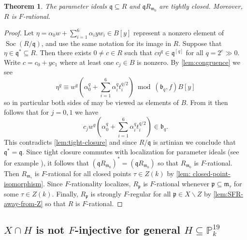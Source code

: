 \documentclass[reqno,11pt]{amsart}
\makeatletter
\numberwithin{equation}{section}
\newtheorem{theorem}{Theorem}[section]
\theoremstyle{definition}
\theoremstyle{definition}
\theoremstyle{definition}
\theoremstyle{remark}
\newcommand{\Soc}{\operatorname{Soc}}
\newcommand{\PP}{\mathbb{P}}
\newcommand{\fm}{\mathfrak{m}}
\newcommand{\fp}{\mathfrak{p}}
\newcommand{\fq}{\mathfrak{q}}
\newcommand{\fb}{\mathfrak{b}}
\renewcommand*{\eqref}[1]{%
  \hyperref[{#1}]{\textup{\tagform@{\ref*{#1}}}}%
}
\makeatother
\begin{document}
\begin{theorem}
    The parameter ideals $\fq\subseteq R$ and $\fq R_{\fm_0}$ are tightly closed. Moreover, $R$ is $F$-rational.
\end{theorem}
\begin{proof}
    Let $\eta=\alpha_0w+\sum\limits_{i=1}^6\alpha_i yw_i\in B[y]$ represent a nonzero element of $\Soc(R/\fq)$, and use the same notation for its image in $R$. Suppose that $\eta\in\fq^*\subseteq R$. Then there exists $0\neq c\in R$ such that $c\eta^q\in\fq^{[q]}$ for all $q=2^e\gg 0$. Write $c=c_0+yc_1$ where at least one $c_j\in B$ is nonzero. By \cref{lem:congruence} we see
    \begin{equation}
        \eta^q\equiv w^q\left(\alpha_0^q+\sum\limits_{i=1}^6\alpha_i^q t_i^{q/2}\right)\bmod (\fb_q,f)B[y]\label{eq:eqn-q-power-sum}
    \end{equation}
    so in particular both sides of \eqref{eq:eqn-q-power-sum} may be viewed as elements of $B$. From \eqref{eq:S-direct-sum} it then follows that for $j=0,1$ we have
    \begin{equation*}
c_jw^q\left(\alpha_0^q+\sum\limits_{i=1}^6\alpha_i^qt_i^{q/2}\right)\in \fb_q.
    \end{equation*} This contradicts \cref{lem:tight-closure} and since $R/\fq$ is artinian we conclude that $\fq^*=\fq$. Since tight closure commutes with localization for parameter ideals (see for example \cite[Proposition 4.14]{HH90}), it follows that $(\fq R_{\fm_0})^*=(\fq R_{\fm_0})$ so that $R_{\fm_0}$ is $F$-rational. Then $R_{\fm_\tau}$ is $F$-rational for all closed points $\tau\in Z(k)$ by \cref{lem: closed-point-isomorphism}. Since $F$-rationality localizes, $R_\fp$ is $F$-rational whenever $\fp\subseteq \fm_\tau$ for some $\tau\in Z(k)$. Finally, $R_\fp$ is strongly $F$-regular for all $\fp\in X\smallsetminus Z$ by \cref{lem:SFR-away-from-Z} so that $R$ is $F$-rational.
\end{proof}

\subsection{\texorpdfstring{$X\cap H$}{X∩H} is not \texorpdfstring{$F$}{F}-injective for general \texorpdfstring{$H\subseteq \PP^{19}_k$}{H⊆ℙ¹⁹ₖ}}
\end{document}

